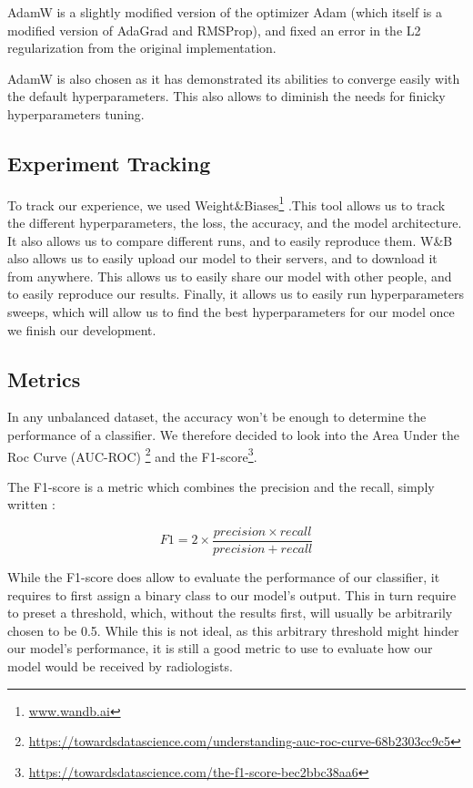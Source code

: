 \documentclass[11pt]{article}
\begin{document}
        AdamW is a slightly modified version of the optimizer Adam (which itself is a modified version of AdaGrad and RMSProp), and fixed an error in the L2 regularization from the original implementation.

        AdamW is also chosen as it has demonstrated its abilities to converge easily with the default hyperparameters. This also allows to diminish the needs for finicky hyperparameters tuning.


    \subsection{Experiment Tracking}
        To track our experience, we used Weight\&Biases\footnote{\url{www.wandb.ai}} .This tool allows us to track the different hyperparameters,
        the loss, the accuracy, and the model architecture. It also allows us to compare different runs, and to easily reproduce them.
        W\&B also allows us to easily upload our model to their servers, and to download it from anywhere. This
        allows us to easily share our model with other people, and to easily reproduce our results. Finally, it allows us
        to easily run hyperparameters sweeps, which will allow us to find the best hyperparameters for our model once we
        finish our development.

    \subsection{Metrics}
        In any unbalanced dataset, the accuracy won't be enough to determine the performance of a classifier.
        We therefore decided to look into the Area Under the Roc Curve (AUC-ROC) \footnote{\url{https://towardsdatascience.com/understanding-auc-roc-curve-68b2303cc9c5}}
        and the F1-score\footnote{\url{https://towardsdatascience.com/the-f1-score-bec2bbc38aa6}}.


        The F1-score is a metric which combines the precision and the recall, simply written :

        \begin{equation}
            F1 = 2 \times \frac{precision \times recall}{precision + recall}
        \end{equation}

        While the F1-score does allow to evaluate the performance of our classifier, it requires to first assign a
        binary class to our model's output. This in turn require to preset a threshold, which, without the results first, will usually be arbitrarily
        chosen to be 0.5. While this is not ideal, as this arbitrary threshold might hinder our model's performance,
        it is still a good metric to use to evaluate how our model would be received by radiologists.
\end{document}
